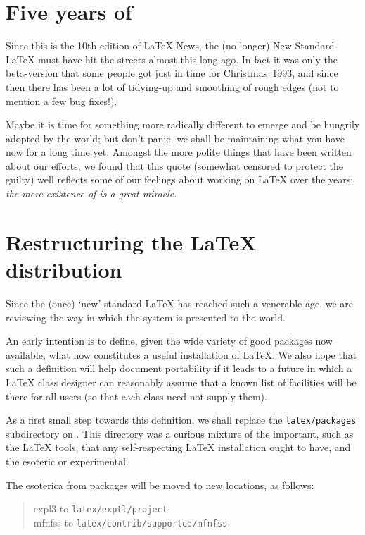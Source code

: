 \documentclass{ltnews}
\providecommand\file[1]{\texttt{#1}}
\begin{document}
\maketitle


\section{Five years of \LaTeXe}

Since this is the 10th edition of \LaTeX{} News, the (no longer) New
Standard \LaTeX{} must have hit the streets almost this long ago.  In
fact it was only the beta-version that some people got just in time for
Christmas~1993, and since then there has been a lot of tidying-up and
smoothing of rough edges (not to mention a few bug fixes!).

Maybe it is time for something more radically different to emerge and
be hungrily adopted by the world; but don't panic, we shall be
maintaining what you have now for a long time yet.  Amongst the more
polite things that have been written about our efforts, we found that this
quote (somewhat censored to protect the guilty) well reflects some of
our feelings about working on \LaTeX{} over the years: \textit{the mere
existence of \LaTeXe{} is a great miracle}.


  \section{Restructuring the \LaTeX{} distribution}

  Since the (once) `new' standard \LaTeX{} has reached such a venerable
  age, we are reviewing the way in which the system is presented to the
  world.

  An early intention is to define, given the wide variety of good
  packages now available, what now constitutes a useful installation of
  \LaTeX{}. We also hope that such a definition will help document
  portability if it leads to a future in which a \LaTeX{} class
  designer can reasonably assume that a known list of
  facilities will be there for all users (so that each class
  need not supply them).

  As a first small step towards this definition, we shall replace the
  \file{latex/packages} subdirectory on \ctan{}.
  This directory was a curious mixture of the important, such as the
  \LaTeX{} \textsf{tools}, that any self-respecting \LaTeX{}
  installation ought to have, and the esoteric or experimental.

  The esoterica from \textsf{packages} will be moved to
  new locations, as follows:
  \begin{quote}
    \textsf{expl3}  to \file{latex/exptl/project}\\
    \textsf{mfnfss} to \file{latex/contrib/supported/mfnfss}
  \end{quote}
\end{document}
